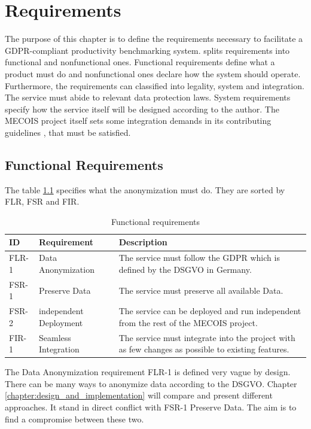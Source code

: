 \chapter{Requirements}
\label{chapter:requirements}

The purpose of this chapter is to define the requirements necessary to facilitate a GDPR-compliant productivity benchmarking system. \textcite{IEEE} splits requirements into functional and nonfunctional ones. Functional requirements define what a product must do and nonfunctional ones declare how the system should operate. Furthermore, the requirements can classified into legality, system and integration. The service must abide to relevant data protection laws. System requirements specify how the service itself will be designed according to the author. The MECOIS project itself sets some integration demands in its contributing guidelines \autocite{github_mecois}, that must be satisfied.

\section{Functional Requirements}
\label{sec:functional_requirements}

The table \ref{tab:functional_requirements} specifies what the anonymization must do.
They are sorted by \ac{FLR}, \ac{FSR} and \ac{FIR}.

\begin{table}[ht]
	\caption{Functional requirements}
	\label{tab:functional_requirements}
	\begin{tabular}{|l|l|p{7cm}|}
		\hline
		ID & Requirement & Description \\
		\hline
		FLR-1 & Data Anonymization & 
		The service must follow the \ac{GDPR} which is defined by the \ac{DSGVO} in Germany. \\
		\hline
		FSR-1 & Preserve Data & 
		The service must preserve all available Data. \\
		\hline
		FSR-2 & independent Deployment & 
		The service can be deployed and run independent from the rest of the MECOIS project. \\
		\hline
		FIR-1 & Seamless Integration &
		The service must integrate into the project with as few changes as possible to existing features. \\
		\hline
	\end{tabular}
\end{table}

The Data Anonymization requirement FLR-1 is defined very vague by design. There can be many ways to anonymize data according to the \ac{DSGVO}. Chapter \ref{chapter:design_and_implementation} will compare and present different approaches. It stand in direct conflict with FSR-1 Preserve Data. The aim is to find a compromise between these two.


